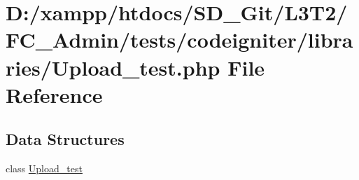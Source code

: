 \hypertarget{_upload__test_8php}{}\section{D\+:/xampp/htdocs/\+S\+D\+\_\+\+Git/\+L3\+T2/\+F\+C\+\_\+\+Admin/tests/codeigniter/libraries/\+Upload\+\_\+test.php File Reference}
\label{_upload__test_8php}
\subsection*{Data Structures}
\begin{DoxyCompactItemize}
\item 
class \hyperlink{class_upload__test}{Upload\+\_\+test}
\end{DoxyCompactItemize}
